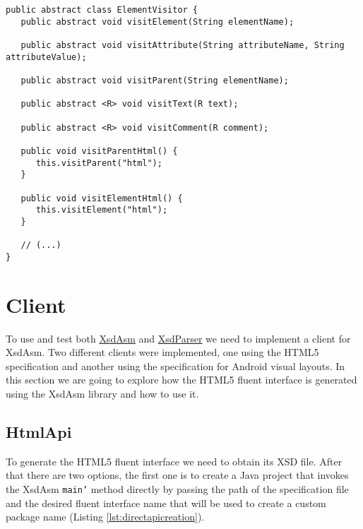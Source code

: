 \bigskip


\begin{minipage}{\linewidth}
\begin{lstlisting}[caption={ElementVisitor generated by XsdAsmFaster},label={lst:elementvisitorxsdasmfaster}]
public abstract class ElementVisitor {
   public abstract void visitElement(String elementName);

   public abstract void visitAttribute(String attributeName, String attributeValue);

   public abstract void visitParent(String elementName);

   public abstract <R> void visitText(R text);

   public abstract <R> void visitComment(R comment);

   public void visitParentHtml() {
      this.visitParent("html");
   }
   
   public void visitElementHtml() {
      this.visitElement("html");
   }
   
   // (...)
}
\end{lstlisting}
\end{minipage}

\newpage

\section{Client} %
\label{sec:client}

To use and test both \hyperref[sec:xsdasm]{XsdAsm} and \hyperref[sec:xsdparser]{XsdParser} we need to implement a client for XsdAsm. Two different clients were implemented, one using the \ac{HTML}5 specification and another using the specification for Android visual layouts. In this section we are going to explore how the \ac{HTML}5 fluent interface is generated using the XsdAsm library and how to use it.

\subsection{HtmlApi}

To generate the \ac{HTML}5 fluent interface we need to obtain its \ac{XSD} file. After that there are two options, the first one is to create a Java project that invokes the XsdAsm \texttt{main'} method directly by passing the path of the specification file and the desired fluent interface name that will be used to create a custom package name (Listing \ref{lst:directapicreation}).

